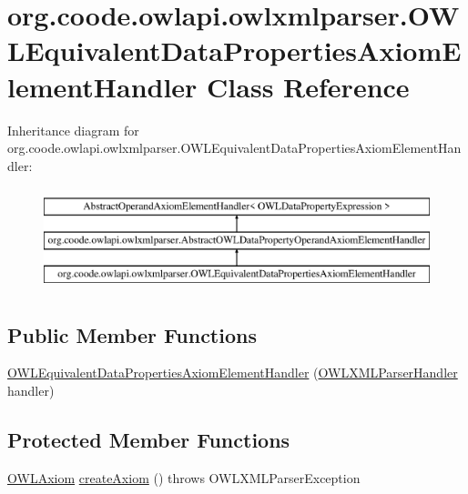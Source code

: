 \hypertarget{classorg_1_1coode_1_1owlapi_1_1owlxmlparser_1_1_o_w_l_equivalent_data_properties_axiom_element_handler}{\section{org.\-coode.\-owlapi.\-owlxmlparser.\-O\-W\-L\-Equivalent\-Data\-Properties\-Axiom\-Element\-Handler Class Reference}
\label{classorg_1_1coode_1_1owlapi_1_1owlxmlparser_1_1_o_w_l_equivalent_data_properties_axiom_element_handler}
}
Inheritance diagram for org.\-coode.\-owlapi.\-owlxmlparser.\-O\-W\-L\-Equivalent\-Data\-Properties\-Axiom\-Element\-Handler\-:\begin{figure}[H]
\begin{center}
\leavevmode
\includegraphics[height=3.000000cm]{classorg_1_1coode_1_1owlapi_1_1owlxmlparser_1_1_o_w_l_equivalent_data_properties_axiom_element_handler}
\end{center}
\end{figure}
\subsection*{Public Member Functions}
\begin{DoxyCompactItemize}
\item 
\hyperlink{classorg_1_1coode_1_1owlapi_1_1owlxmlparser_1_1_o_w_l_equivalent_data_properties_axiom_element_handler_a8df20fce441c218a4aff61fbb89d01fa}{O\-W\-L\-Equivalent\-Data\-Properties\-Axiom\-Element\-Handler} (\hyperlink{classorg_1_1coode_1_1owlapi_1_1owlxmlparser_1_1_o_w_l_x_m_l_parser_handler}{O\-W\-L\-X\-M\-L\-Parser\-Handler} handler)
\end{DoxyCompactItemize}
\subsection*{Protected Member Functions}
\begin{DoxyCompactItemize}
\item 
\hyperlink{interfaceorg_1_1semanticweb_1_1owlapi_1_1model_1_1_o_w_l_axiom}{O\-W\-L\-Axiom} \hyperlink{classorg_1_1coode_1_1owlapi_1_1owlxmlparser_1_1_o_w_l_equivalent_data_properties_axiom_element_handler_acaa5dfc1b591b60f1fd7713c0c26bc51}{create\-Axiom} ()  throws O\-W\-L\-X\-M\-L\-Parser\-Exception 
\end{DoxyCompactItemize}


